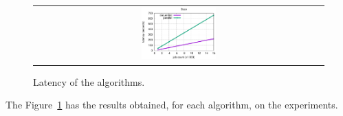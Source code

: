 \documentclass[conference,compsoc]{IEEEtran}
\begin{document}
\begin{figure}[h!]
\begin{tabular}{cc}
    \multicolumn{2}{c}{\includegraphics[width=0.265\textwidth]{plots/Scan.eps}}\\

  \end{tabular}
\caption{Latency of the algorithms.} \label{latency}
\end{figure}

The Figure~\ref{latency} has the results obtained, for each algorithm, on the experiments.

\end{document}

